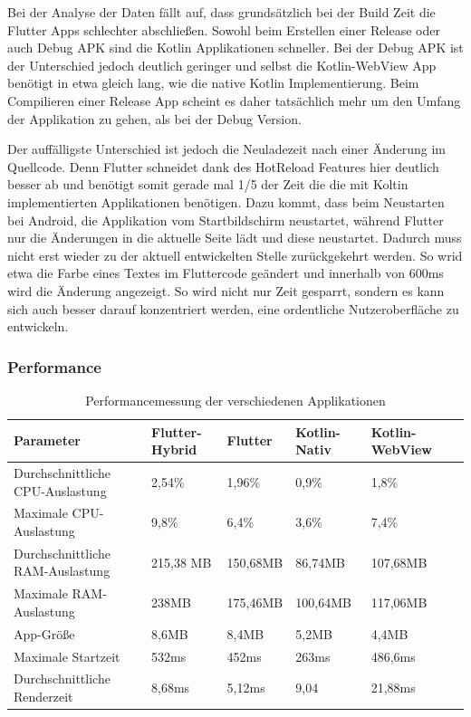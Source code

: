 Bei der Analyse der Daten fällt auf, dass grundsätzlich bei der Build Zeit die Flutter Apps schlechter abschließen. Sowohl beim Erstellen einer Release oder auch Debug \ac{APK} sind die Kotlin Applikationen schneller. Bei der Debug \ac{APK} ist der Unterschied jedoch deutlich geringer und selbst die Kotlin-WebView App benötigt in etwa gleich lang, wie die native Kotlin Implementierung. Beim Compilieren einer Release App scheint es daher tatsächlich mehr um den Umfang der Applikation zu gehen, als bei der Debug Version.

Der auffälligste Unterschied ist jedoch die Neuladezeit nach einer Änderung im Quellcode. Denn Flutter schneidet dank des HotReload Features hier deutlich besser ab und benötigt somit gerade mal 1/5 der Zeit die die mit Koltin implementierten Applikationen benötigen. Dazu kommt, dass beim Neustarten bei Android, die Applikation vom Startbildschirm neustartet, während Flutter nur die Änderungen in die aktuelle Seite lädt und diese neustartet. Dadurch muss nicht erst wieder zu der aktuell entwickelten Stelle zurückgekehrt werden. So wrid etwa die Farbe eines Textes im Fluttercode geändert und innerhalb von 600ms wird die Änderung angezeigt. So wird nicht nur Zeit gesparrt, sondern es kann sich auch besser darauf konzentriert werden, eine ordentliche Nutzeroberfläche zu entwickeln.

\subsubsection{Performance}

\begin{table}
\centering
\caption{Performancemessung der verschiedenen Applikationen }
\begin{tabular}{ |p{4cm}||p{3cm}|p{2cm}|p{2cm}|p{2cm}|p{2cm}| }
 \hline
 Parameter & Flutter-Hybrid & Flutter & Kotlin-Nativ & Kotlin-WebView \\
 \hline
 Durchschnittliche CPU-Auslastung       &   2,54\%&   1,96\%& 0,9\%& 1,8\%\\
  \hline
 Maximale CPU- Auslastung  & 9,8\%& 6,4\%& 3,6\%& 7,4\%\\
  \hline
 Durchschnittliche RAM-Auslastung & 215,38 MB& 150,68MB& 86,74MB& 107,68MB\\
  \hline
 Maximale RAM- Auslastung & 238MB& 175,46MB& 100,64MB& 117,06MB\\
  \hline
 App-Größe & 8,6MB& 8,4MB& 5,2MB& 4,4MB\\
  \hline
 Maximale Startzeit & 532ms& 452ms& 263ms& 486,6ms\\
 \hline
 Durchschnittliche Renderzeit &8,68ms& 5,12ms& 9,04& 21,88ms\\
 \hline
\end{tabular}
\label{tab:evaluations_performance}
\end{table}

